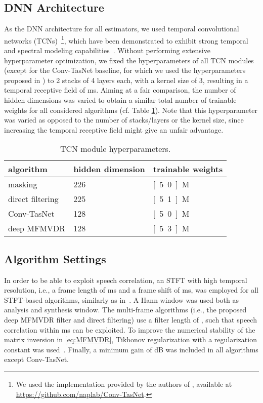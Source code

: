 \documentclass{article}
\begin{document}
\subsection{DNN Architecture}
\label{sec:dnn architecture}
As the DNN architecture for all estimators, we used temporal convolutional networks (TCNs)~\cite{bai_empirical_2018}\footnote{We used the implementation provided by the authors of \cite{luo_conv-tasnet_2019}, available at \href{https://github.com/naplab/Conv-TasNet}{https://github.com/naplab/Conv-TasNet}.}, which have been demonstrated to exhibit strong temporal and spectral modeling capabilities~\cite{luo_conv-tasnet_2019}.
Without performing extensive hyperparameter optimization, we fixed the hyperparameters of all TCN modules (except for the Conv-TasNet baseline, for which we used the hyperparameters proposed in \cite{luo_conv-tasnet_2019}) to 2 stacks of 4 layers each, with a kernel size of 3, resulting in a temporal receptive field of \unit[128]{ms}.
Aiming at a fair comparison, the number of hidden dimensions was varied to obtain a similar total number of trainable weights for all considered algorithms (cf. Table \ref{tab:hyperparams}).
Note that this hyperparameter was varied as opposed to the number of stacks/layers or the kernel size, since increasing the temporal receptive field might give an unfair advantage.
\begin{table}
	\begin{tabularx}{\linewidth}{l|l|l}
		algorithm & hidden dimension & trainable weights\\
		\toprule[2pt]
		masking & 226 & \unit[5.0]{M}\\
		direct filtering & 225 & \unit[5.1]{M}\\
		Conv-TasNet & 128 & \unit[5.0]{M}\\
		\midrule[1pt]
		deep MFMVDR & 128 &\unit[5.3]{M}
	\end{tabularx}
	\caption{TCN module hyperparameters.}
	\label{tab:hyperparams}
\end{table}

\subsection{Algorithm Settings}
\label{sec:settings}
In order to be able to exploit speech correlation, an STFT with high temporal resolution, i.e., a frame length of \unit[8]{ms} and a frame shift of \unit[2]{ms}, was employed for all STFT-based algorithms, similarly as in~\cite{huang_multi-frame_2012}.
A Hann window was used both as analysis and synthesis window.
The multi-frame algorithms (i.e., the proposed deep MFMVDR filter and direct filtering) use a filter length of , such that speech correlation within \unit[16]{ms} can be exploited.
To improve the numerical stability of the matrix inversion in \eqref{eq:MFMVDR}, Tikhonov regularization with a regularization constant  was used~\cite{huang_multi-frame_2012,schasse_estimation_2014}.
Finally, a minimum gain of \unit[-17]{dB} was included in all algorithms except Conv-TasNet.
\end{document}
